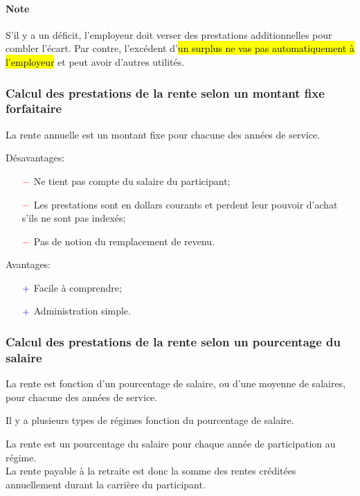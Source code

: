 \documentclass[10pt, french]{article}
\begin{document}
\begin{multicols*}{3}
\begin{definitionNOHFILLsub}
\paragraph{Note} S'il y a un déficit, l'employeur doit verser des prestations additionnelles pour combler l'écart. Par contre, l'excédent d'\hl{un surplus ne vas pas automatiquement à l'employeur} et peut avoir d'autres utilités.
\end{definitionNOHFILLsub}

\subsubsection*{Calcul des prestations de la rente selon un montant fixe forfaitaire}

\begin{definitionNOHFILL}
La rente annuelle est un montant fixe pour chacune des années de service.

Désavantages:
\begin{itemize}
	\item[$\color{red}-$]	Ne tient pas compte du salaire du participant;
	\item[$\color{red}-$]	Les prestations sont en dollars courants et perdent leur pouvoir d'achat s'ils ne sont pas indexés;
	\item[$\color{red}-$]	Pas de notion du remplacement de revenu.
\end{itemize}

Avantages:
\begin{itemize}
	\item[$\color{blue}+$]	Facile à comprendre;
	\item[$\color{blue}+$]	Administration simple.
\end{itemize}
\end{definitionNOHFILL}

\subsubsection*{Calcul des prestations de la rente selon un pourcentage du salaire}

La rente est fonction d'un pourcentage de salaire, ou d'une moyenne de salaires, pour chacune des années de service.

Il y a plusieurs types de régimes fonction du pourcentage de salaire.

\begin{definitionNOHFILL}
La rente est un pourcentage du salaire pour chaque année de participation au régime. \\
La rente payable à la retraite est donc la somme des rentes créditées annuellement durant la carrière du participant.


\end{definitionNOHFILL}
\end{multicols*}
\end{document}
